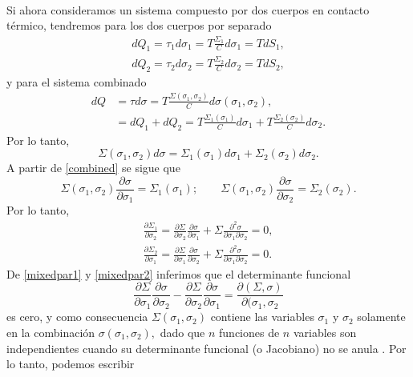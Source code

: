 \documentclass{article}
\theoremstyle{definition} \newtheorem{defi}{Definici\'on}
\theoremstyle{definition} \newtheorem{teo}{Teorema}
\theoremstyle{definition} \newtheorem{cor}{Corolario}
\begin{document}
\paragraph{}
Si ahora consideramos un sistema compuesto por dos cuerpos en contacto t\'ermico, tendremos para los dos cuerpos por separado
\begin{align}
dQ_1 = \tau_1 d\sigma_1 = T \frac{\Sigma_1}{C}d\sigma_1 = TdS_1,\label{thermeq1}\\
dQ_2 = \tau_2 d\sigma_2 = T \frac{\Sigma_2}{C}d\sigma_2 = TdS_2,\label{thermeq2}
\end{align}
y para el sistema combinado
\begin{align}
dQ&=\tau d\sigma=T\frac{\Sigma(\sigma_1,\sigma_2)}{C}d\sigma(\sigma_1,\sigma_2),\label{entrop1}\\
&=dQ_1+dQ_2=T\frac{\Sigma_1(\sigma_1)}{C}d\sigma_1+T\frac{\Sigma_2(\sigma_2)}{C}d\sigma_2.
\end{align}
Por lo tanto,
\begin{equation}\label{combined}
\Sigma(\sigma_1,\sigma_2)d\sigma = \Sigma_1(\sigma_1)d\sigma_1 + \Sigma_2(\sigma_2)d\sigma_2.
\end{equation}
A partir de \eqref{combined} se sigue que
\begin{equation}
\Sigma(\sigma_1,\sigma_2)\frac{\partial \sigma}{\partial \sigma_1} =\Sigma_1(\sigma_1); \qquad \Sigma(\sigma_1,\sigma_2)\frac{\partial \sigma}{\partial \sigma_2} =\Sigma_2(\sigma_2).
\end{equation}
Por lo tanto,
\begin{align}
\frac{\partial \Sigma_1}{\partial \sigma_2}= \frac{\partial \Sigma}{\partial \sigma_2}\frac{\partial \sigma}{\partial \sigma_1}+\Sigma\frac{\partial^2 \sigma}{\partial \sigma_1\partial \sigma_2}=0,\label{mixedpar1}\\
\frac{\partial \Sigma_2}{\partial \sigma_1}= \frac{\partial \Sigma}{\partial \sigma_1}\frac{\partial \sigma}{\partial \sigma_2}+\Sigma\frac{\partial^2 \sigma}{\partial \sigma_1\partial \sigma_2}=0.\label{mixedpar2}
\end{align}
De \eqref{mixedpar1} y \eqref{mixedpar2} inferimos que el determinante funcional
\begin{equation}
\frac{\partial \Sigma}{\partial \sigma_1}\frac{\partial \sigma}{\partial \sigma_2}-\frac{\partial \Sigma}{\partial \sigma_2}\frac{\partial \sigma}{\partial \sigma_1}=\frac{\partial(\Sigma,\sigma)}{\partial(\sigma_1,\sigma_2}
\end{equation}
es cero, y como consecuencia $\Sigma(\sigma_1,\sigma_2)$ contiene las variables $\sigma_1$ y $\sigma_2$ solamente en la combinaci\'on $\sigma(\sigma_1,\sigma_2),$ dado que $n$ funciones de $n$ variables son independientes cuando su determinante funcional (o Jacobiano) no se anula \cite{LC}.  Por lo tanto, podemos escribir
\end{document}
